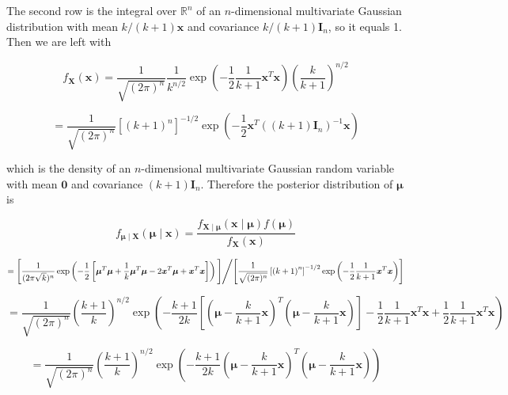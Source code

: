 \begin{solution}
\begin{enumerate}[(a)]
The second row is the integral over \(\mathbb{R}^n\) of an \(n\)-dimensional multivariate Gaussian distribution with mean \(k/(k+1) \boldsymbol{x}\) and covariance \(k/(k+1) \boldsymbol{I}_n\), so it equals 1. Then we are left with

\[
f_{\boldsymbol{X}}(\boldsymbol{x})  =\frac{1}{\sqrt{(2 \pi )^n}}  \frac{1}{k^{n/2}}\exp \left(- \frac{1}{2} \frac{1}{k+1} \boldsymbol{x}^T \boldsymbol{x}   \right)\left( \frac{k}{k+1} \right)^{n/2}
\]

\begin{equation}\label{2018.screen.3.d.marginal.x.gaussian}
=\frac{1}{\sqrt{(2 \pi )^n}} \left[ \left( k+1 \right)^n \right]^{-1/2} \exp \left(- \frac{1}{2} \boldsymbol{x}^T \left( (k+1) \boldsymbol{I}_n \right)^{-1} \boldsymbol{x}   \right)
\end{equation}

which is the density of an \(n\)-dimensional multivariate Gaussian random variable with mean \(\boldsymbol{0}\) and covariance \((k+1)\boldsymbol{I}_n\). Therefore the posterior distribution of \(\boldsymbol{\mu}\) is

\[
f_{\boldsymbol{\mu} \mid \boldsymbol{X}}(\boldsymbol{\mu} \mid \boldsymbol{x}) = \frac{f_{\boldsymbol{X} \mid \boldsymbol{\mu}}(\boldsymbol{x} \mid \boldsymbol{\mu}) f(\boldsymbol{\mu})}{f_{\boldsymbol{X}}(\boldsymbol{x})}
\]

\[
= \left[   \frac{1}{(2 \pi \sqrt{k})^n  }  \exp \left(- \frac{1}{2}\left[  \boldsymbol{\mu} ^T\boldsymbol{\mu}  + \frac{1}{k}\boldsymbol{\mu} ^T  \boldsymbol{\mu}  - 2 \boldsymbol{x} ^T\boldsymbol{\mu}   + \boldsymbol{x}^T \boldsymbol{x}  \right]  \right)  \Bigg] \middle/  \Bigg[ \frac{1}{\sqrt{(2 \pi )^n}} \left[ \left( k+1 \right)^n \right]^{-1/2} \exp \left(- \frac{1}{2} \frac{1}{k+1} \boldsymbol{x}^T \boldsymbol{x}   \right) \right]
\]

\[
=  \frac{1}{\sqrt{(2\pi)^n}} \left( \frac{k+1}{k} \right)^{n/2} \exp  \left(-  \frac{k+1}{2k} \left[  \left( \boldsymbol{\mu} -  \frac{k}{k+1}  \boldsymbol{x} \right) ^T\left( \boldsymbol{\mu} -  \frac{k}{k+1} \boldsymbol{x} \right) \right] - \frac{1}{2} \frac{1}{k+1}  \boldsymbol{x}^T \boldsymbol{x}  + \frac{1}{2} \frac{1}{k+1} \boldsymbol{x}^T \boldsymbol{x}\right)  
\]

\[
=  \frac{1}{\sqrt{(2\pi)^n}} \left( \frac{k+1}{k} \right)^{n/2} \exp  \left(-  \frac{k+1}{2k}  \left( \boldsymbol{\mu} -  \frac{k}{k+1}  \boldsymbol{x} \right) ^T\left( \boldsymbol{\mu} -  \frac{k}{k+1} \boldsymbol{x} \right)\right)  
\]


\end{enumerate}
\end{solution}
